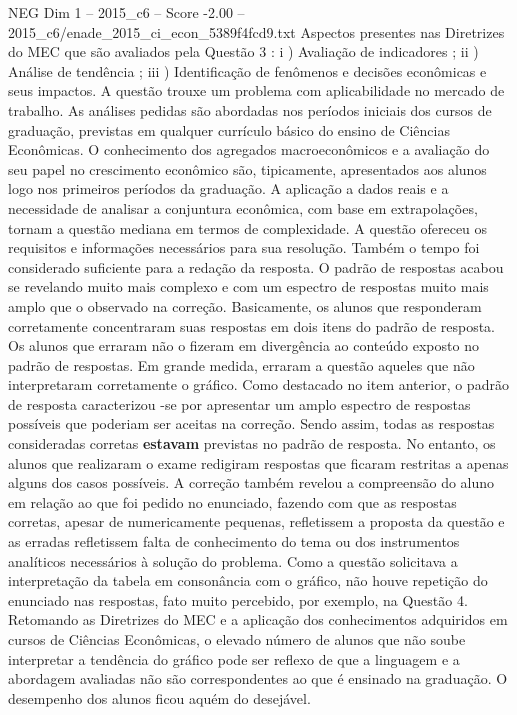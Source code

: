\begin{textsample}{NEG Dim 1 – 2015\_c6 – Score -2.00 – 2015\_c6/enade\_2015\_ci\_econ\_5389f4fcd9.txt}
Aspectos presentes nas Diretrizes do MEC que são avaliados pela Questão 3 : i ) Avaliação de indicadores ; ii ) Análise de tendência ; iii ) Identificação de fenômenos e decisões econômicas e seus impactos.
A questão trouxe um problema com aplicabilidade no mercado de trabalho.
As análises pedidas são abordadas nos períodos iniciais dos cursos de graduação, previstas em qualquer currículo básico do ensino de Ciências Econômicas.
O conhecimento dos agregados macroeconômicos e a avaliação do seu papel no crescimento econômico são, tipicamente, apresentados aos alunos logo nos primeiros períodos da graduação.
A aplicação a dados reais e a necessidade de analisar a conjuntura econômica, com base em extrapolações, tornam a questão mediana em termos de complexidade.
A questão ofereceu os requisitos e informações necessários para sua resolução.
Também o tempo foi considerado suficiente para a redação da resposta.
O padrão de respostas acabou se revelando muito mais complexo e com um espectro de respostas muito mais amplo que o observado na correção.
Basicamente, os alunos que responderam corretamente concentraram suas respostas em dois itens do padrão de resposta.
Os alunos que erraram não o fizeram em divergência ao conteúdo exposto no padrão de respostas.
Em grande medida, erraram a questão aqueles que não interpretaram corretamente o gráfico.
Como destacado no item anterior, o padrão de resposta caracterizou -se por apresentar um amplo espectro de respostas possíveis que poderiam ser aceitas na correção.
Sendo assim, todas as respostas consideradas corretas \textbf{estavam} previstas no padrão de resposta.
No entanto, os alunos que realizaram o exame redigiram respostas que ficaram restritas a apenas alguns dos casos possíveis.
A correção também revelou a compreensão do aluno em relação ao que foi pedido no enunciado, fazendo com que as respostas corretas, apesar de numericamente pequenas, refletissem a proposta da questão e as erradas refletissem falta de conhecimento do tema ou dos instrumentos analíticos necessários à solução do problema.
Como a questão solicitava a interpretação da tabela em consonância com o gráfico, não houve repetição do enunciado nas respostas, fato muito percebido, por exemplo, na Questão 4.
Retomando as Diretrizes do MEC e a aplicação dos conhecimentos adquiridos em cursos de Ciências Econômicas, o elevado número de alunos que não soube interpretar a tendência do gráfico pode ser reflexo de que a linguagem e a abordagem avaliadas não são correspondentes ao que é ensinado na graduação.
O desempenho dos alunos ficou aquém do desejável.

\end{textsample}
